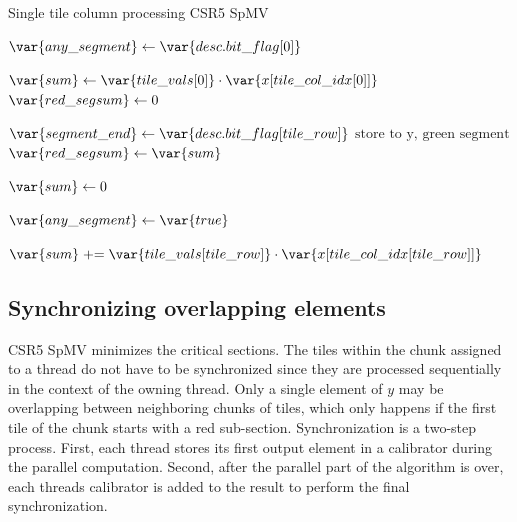 \documentclass[thesis=M,english]{FITthesis}[2019/12/23]
\newcommand{\pluseq}{\mathrel{+}=}
\begin{document}
\begin{algorithm}[h]
    \caption{Single tile column processing CSR5 SpMV}\label{csr5:spmv:single_tile}
    \begin{algorithmic}

        \State $\var{any\_segment} \gets \var{desc.bit\_flag[0]}$

        \State $\var{sum} \gets \var{tile\_vals[0]} \cdot \var{x[tile\_col\_idx[0]]}$
        \State $\var{red\_segsum} \gets 0$

        \State $\var{segment\_end} \gets \var{desc.bit\_flag[tile\_row]}$
        \State $\text{store to y, green segment}$
        \Else
        \State $\var{red\_segsum} \gets \var{sum}$
        \EndIf

        \State $\var{sum} \gets 0$

        \State $\var{any\_segment} \gets \var{true}$
        \EndIf

        \State $\var{sum} \pluseq \var{tile\_vals[tile\_row]} \cdot \var{x[tile\_col\_idx[tile\_row]]}$
        \EndFor
        \State ${}$ 
        \EndFunction
    \end{algorithmic}
\end{algorithm}


\subsection{Synchronizing overlapping elements}

CSR5 SpMV minimizes the critical sections. The tiles within the chunk assigned to a thread do not have to be
synchronized since they are processed sequentially in the context of the owning thread. Only a single element of
\(y\) may be overlapping between neighboring chunks of tiles, which only happens if the first tile of the
chunk starts with a red sub-section. Synchronization is a two-step process. First, each thread
stores its first output element in a calibrator during the parallel computation. 
Second, after the parallel part of the algorithm is over, each threads calibrator is added to the result 
to perform the final synchronization.
\end{document}
